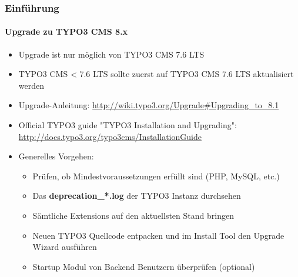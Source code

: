 \begin{frame}[fragile]
	\frametitle{Einführung}
	\framesubtitle{Upgrade zu TYPO3 CMS 8.x}

	\begin{itemize}
		\item Upgrade ist nur möglich von TYPO3 CMS 7.6 LTS
		\item TYPO3 CMS < 7.6 LTS sollte zuerst auf TYPO3 CMS 7.6 LTS aktualisiert werden
	\end{itemize}

	\begin{itemize}

		\item Upgrade-Anleitung:\newline
			\smaller\url{http://wiki.typo3.org/Upgrade#Upgrading_to_8.1}\normalsize
		\item Official TYPO3 guide "TYPO3 Installation and Upgrading":
			\smaller\url{http://docs.typo3.org/typo3cms/InstallationGuide}\normalsize
		\item Generelles Vorgehen:
			\begin{itemize}
				\item Prüfen, ob Mindestvoraussetzungen erfüllt sind \small(PHP, MySQL, etc.)
				\item Das \textbf{deprecation\_*.log} der TYPO3 Instanz durchsehen
				\item Sämtliche Extensions auf den aktuellsten Stand bringen
				\item Neuen TYPO3 Quellcode entpacken und im Install Tool den Upgrade Wizard ausführen
				\item Startup Modul von Backend Benutzern überprüfen (optional)
			\end{itemize}
	\end{itemize}

\end{frame}

